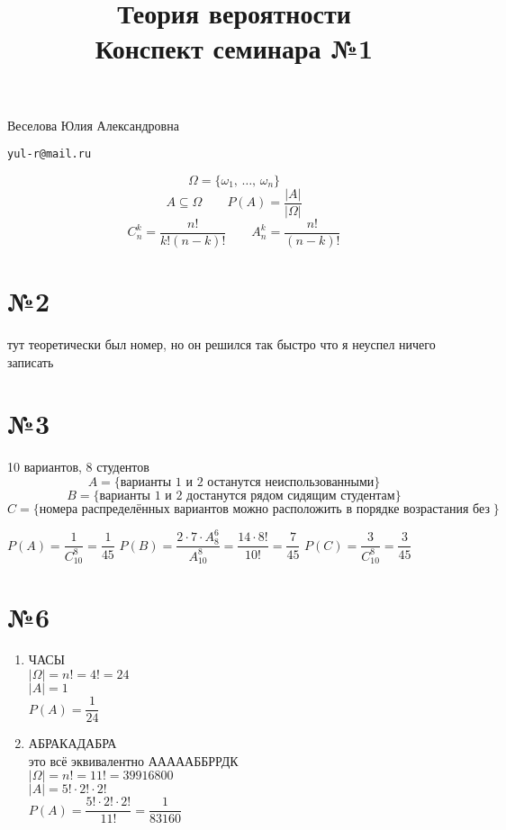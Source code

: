\documentclass{article}
\title{Теория вероятности \\ Конспект семинара №1}
\begin{document}
  \maketitle

  \hfill {\Large Веселова Юлия Александровна} \hfill

  \hfill \texttt{yul-r@mail.ru} \hfill

  $$ \Omega = \{\omega_1,\, \dots,\, \omega_n\} $$
  $$ A \subseteq \Omega \qquad P(A) = \frac{\left|A\right|}{\left|\Omega\right|} $$
  $$ C^k_n = \frac{n!}{k!(n-k)!} \qquad A^k_n = \frac{n!}{(n-k)!} $$

  \section*{№2}
  тут теоретически был номер, но он решился так быстро что я неуспел ничего записать

  \section*{№3}
  10 вариантов, 8 студентов
  $$ A = \{ \text{варианты } 1 \text{ и } 2 \text{ останутся неиспользованными} \} $$
  $$ B = \{ \text{варианты } 1 \text{ и } 2 \text{ достанутся рядом сидящим студентам} \} $$
  $$ C = \{ \text{номера распределённых вариантов можно расположить в порядке возрастания без пропусков} \} $$

  \vspace{.5cm}\noindent
  $ P(A) = \dfrac{1}{C^8_{10}} = \dfrac{1}{45} $ \hfill
  $ P(B) = \dfrac{2\cdot 7 \cdot A^6_8}{A^8_{10}} = \dfrac{14 \cdot 8!}{10!} = \dfrac{7}{45} $ \hfill
  $ P(C) = \dfrac{3}{C^8_{10}} = \dfrac{3}{45} $

  \section*{№6}
  \begin{enumerate}
    \item ЧАСЫ \\
      $ \left|\Omega\right| = n! = 4! = 24 $ \\
      $ \left|A\right| = 1 $ \\
      $ P(A) = \dfrac{1}{24} $
    \item АБРАКАДАБРА \\
      это всё эквивалентно АААААББРРДК \\
      $ \left|\Omega\right| = n! = 11! = 39916800 $ \\
      $ \left|A\right| = 5! \cdot 2! \cdot 2! $ \\
      $ P(A) = \dfrac{5! \cdot 2! \cdot 2!}{11!} = \dfrac{1}{83160} $
  \end{enumerate}
\end{document}

